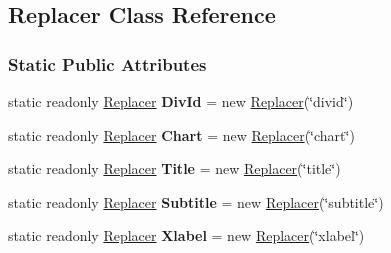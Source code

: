 \hypertarget{classHighcharts_1_1Replacer}{}\subsection{Replacer Class Reference}
\label{classHighcharts_1_1Replacer}
\subsubsection*{Static Public Attributes}
\begin{DoxyCompactItemize}
\item 
\mbox{\label{classHighcharts_1_1Replacer_a5dace676ed4488f45f5851faf4f1fb2f}} 
static readonly \hyperlink{classHighcharts_1_1Replacer}{Replacer} {\bfseries Div\+Id} = new \hyperlink{classHighcharts_1_1Replacer}{Replacer}(\char`\"{}divid\char`\"{})
\item 
\mbox{\label{classHighcharts_1_1Replacer_a29f636c1789eae7c6ca026b3cb160ce2}} 
static readonly \hyperlink{classHighcharts_1_1Replacer}{Replacer} {\bfseries Chart} = new \hyperlink{classHighcharts_1_1Replacer}{Replacer}(\char`\"{}chart\char`\"{})
\item 
\mbox{\label{classHighcharts_1_1Replacer_a3be5d0ad416935a20ec78b6d17531f5d}} 
static readonly \hyperlink{classHighcharts_1_1Replacer}{Replacer} {\bfseries Title} = new \hyperlink{classHighcharts_1_1Replacer}{Replacer}(\char`\"{}title\char`\"{})
\item 
\mbox{\label{classHighcharts_1_1Replacer_a87e86b9f31233bc9cd9dbd3a43baf3f1}} 
static readonly \hyperlink{classHighcharts_1_1Replacer}{Replacer} {\bfseries Subtitle} = new \hyperlink{classHighcharts_1_1Replacer}{Replacer}(\char`\"{}subtitle\char`\"{})
\item 
\mbox{\label{classHighcharts_1_1Replacer_ac2709d3d7237a737809fad8d72ad57a8}} 
static readonly \hyperlink{classHighcharts_1_1Replacer}{Replacer} {\bfseries Xlabel} = new \hyperlink{classHighcharts_1_1Replacer}{Replacer}(\char`\"{}xlabel\char`\"{})
\item 
\mbox{\label{classHighcharts_1_1Replacer_a3f74a9d3e0f6b6bb93aac9d4ba30c8cc}} 

\end{DoxyCompactItemize}
